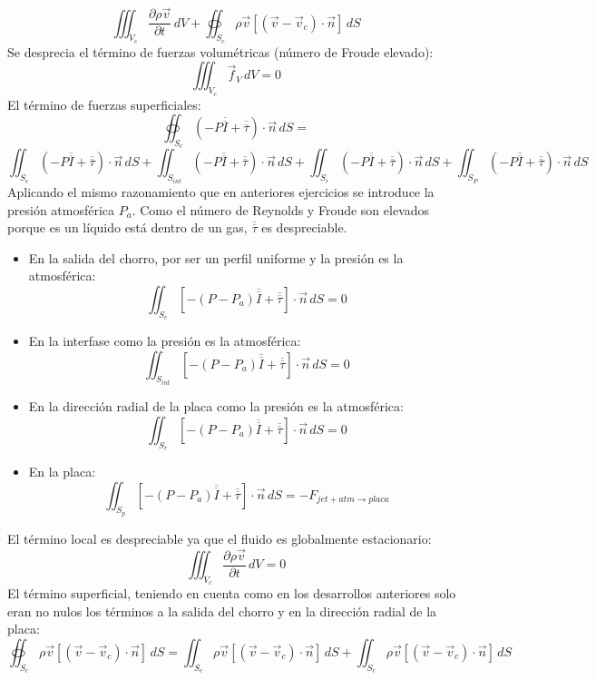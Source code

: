 \begin{enumerate}
{\[		\iiint_{V_c}\frac{\partial \rho\vec{v}}{\partial t}\,dV
		+ \oiint_{S_c}\rho\vec{v}\left[\left(\vec{v}-\vec{v}_c\right)\cdot\vec{n}\right]\,dS\]
	Se desprecia el término de fuerzas volumétricas (número de Froude elevado):
		\[\iiint_{V_c}\vec{f}_V\,dV=0\]
	El término de fuerzas superficiales:
		\[\oiint_{S_c}\left(-P\overline{\overline{I}}+\overline{\overline{\tau}}\right)\cdot\vec{n}\,dS=\]
		\[
		\iint_{S_e}\left(-P\overline{\overline{I}}+\overline{\overline{\tau}}\right)\cdot\vec{n}\,dS
		+
		\iint_{S_{int}}\left(-P\overline{\overline{I}}+\overline{\overline{\tau}}\right)\cdot\vec{n}\,dS
		+
		\iint_{S_r}\left(-P\overline{\overline{I}}+\overline{\overline{\tau}}\right)\cdot\vec{n}\,dS
		+
		\iint_{S_P}\left(-P\overline{\overline{I}}+\overline{\overline{\tau}}\right)\cdot\vec{n}\,dS
		\]
	Aplicando el mismo razonamiento que en anteriores ejercicios se introduce la presión atmosférica $P_a$. Como el número de Reynolds y Froude son elevados porque es un líquido está dentro de un gas, $\overline{\overline{\tau}} $ es despreciable.
	\begin{itemize}
		\item En la salida del chorro, por ser un perfil uniforme y la presión es la atmosférica:
			\[\iint_{S_e}\left[-(P-P_a)\overline{\overline{I}}+\overline{\overline{\tau}}\right]\cdot\vec{n}\,dS=0\]
		\item En la interfase como la presión es la atmosférica:
			\[\iint_{S_{int}}\left[-(P-P_a)\overline{\overline{I}}+\overline{\overline{\tau}}\right]\cdot\vec{n}\,dS=0\]
		\item En la dirección radial de la placa como la presión es la atmosférica:
			\[\iint_{S_r}\left[-(P-P_a)\overline{\overline{I}}+\overline{\overline{\tau}}\right]\cdot\vec{n}\,dS=0\]
		\item En la placa:
			\[\iint_{S_p}\left[-(P-P_a)\overline{\overline{I}}+\overline{\overline{\tau}}\right]\cdot\vec{n}\,dS=-F_{jet+atm\rightarrow placa}\]
	\end{itemize}
	El término local es despreciable ya que el fluido es globalmente estacionario:
		\[\iiint_{V_c}\frac{\partial \rho\vec{v}}{\partial t}\,dV=0\]
	El término superficial, teniendo en cuenta como en los desarrollos anteriores solo eran no nulos los términos a la salida del chorro y en la dirección radial de la placa:
		\[\oiint_{S_c}\rho\vec{v}\left[\left(\vec{v}-\vec{v}_c\right)\cdot\vec{n}\right]\,dS=
		\iint_{S_e}\rho\vec{v}\left[\left(\vec{v}-\vec{v}_c\right)\cdot\vec{n}\right]\,dS
		+
		\iint_{S_r}\rho\vec{v}\left[\left(\vec{v}-\vec{v}_c\right)\cdot\vec{n}\right]\,dS\]
}
\end{enumerate}
